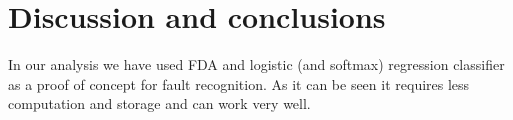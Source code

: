 \documentclass[energies,article,submit,pdftex,moreauthors]{Definitions/mdpi}
\begin{document}





\section{Discussion and conclusions}
In our analysis we have used FDA and logistic (and softmax) regression classifier as a proof of concept for fault recognition. As it can be seen it requires less computation and storage and can work very well. 
\end{document}
